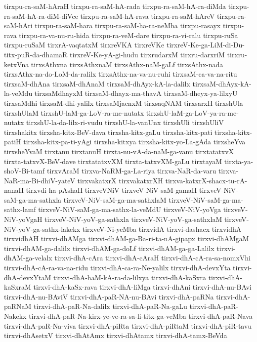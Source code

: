 {tirxpu-ra-saM-hAraH
tirxpu-ra-saM-hA-rada
tirxpu-ra-saM-hA-ra-diMda
tirxpu-ra-saM-hA-ra-diM-diVce
tirxpu-ra-saM-hA-rava
tirxpu-ra-saM-hAreV
tirxpu-ra-saM-hAri
tirxpu-ra-saM-hara
tirxpu-ra-saM-ha-ra-neMba
tirxpu-rasayx
tirxpu-rava
tirxpu-ra-va-nu-ru-hida
tirxpu-ra-veM-dare
tirxpu-ra-vi-ralu
tirxpu-ruSa
tirxpu-ruSaM
tirxrA-vaqtatxM
tirxreVKA
tirxreVKe
tirxreV-Ke-ga-LiM-di-Du-titx-puR-da-dhamaR
tirxreV-Ke-yA-gi-hudu
tirxrudarxM
tirxru-darxriM
tirxru-ketxVna
tirxsAthxna
tirxsAthxnaM
tirxsAthx-naM-gaLf
tirxsAthx-nada
tirxsAthx-na-do-LoM-da-ralilx
tirxsAthx-na-va-nu-ruhi
tirxsaM-ca-va-na-ritu
tirxsaM-dhAna
tirxsaM-dhAnaM
tirxsaM-dhAyx-kA-la-dalilx
tirxsaM-dhAyx-kA-la-veMdu
tirxsaMdhayxM
tirxsaM-dhayx-ma-thavA
tirxsaM-dheyx-ya-lilxyU
tirxsaMdhi
tirxsaM-dhi-yalilx
tirxsaMjacnxM
tirxsaqNAM
tirxsarxH
tirxshUla
tirxshUlaM
tirxshU-laM-ga-LoV-ra-me-nutatx
tirxshU-laM-ga-LoV-ya-ra-me-nutatx
tirxshU-la-da-lilx-ri-vudu
tirxshU-la-vanUnx
tirxshUli
tirxshUliV
tirxshakitx
tirxsha-kitx-BeV-dava
tirxsha-kitx-gaLu
tirxsha-kitx-pati
tirxsha-kitx-patiH
tirxsha-kitx-pa-ti-yAgi
tirxsha-kitxya
tirxsha-kitx-yo-La-gAda
tirxsheYva
tirxsheYvaM
tirxtanu
tirxtanuH
tirxta-nu-vA-da-naM-ga-vanu
tirxtatatxvX
tirxta-tatxvX-BeV-dave
tirxtatatxvXM
tirxta-tatxvXM-gaLu
tirxtayaM
tirxta-ya-shoV-Bi-tamf
tirxvAraM
tirxva-NaRM-ga-La-riya
tirxva-NaR-da-varu
tirxva-NaR-ma-Bi-dhiV-yateV
tirxvakatxrX
tirxvakatxrXH
tirxva-katxrX-shacx-tu-rA-nanaH
tirxvdi-ha-pAshaH
tirxveVNiV
tirxveV-NiV-saM-gamaH
tirxveV-NiV-saM-ga-ma-sathxla
tirxveV-NiV-saM-ga-ma-sathxlaM
tirxveV-NiV-saM-ga-ma-sathx-lamf
tirxveV-NiV-saM-ga-ma-sathx-la-veMdU
tirxveV-NiV-yoVga
tirxveV-NiV-yoVgaH
tirxveV-NiV-yoV-ga-sathxla
tirxveV-NiV-yoV-ga-sathxlaM
tirxveV-NiV-yoV-ga-sathx-lakekx
tirxveV-Ni-yeMba
tirxvidA
tirxvi-dashacx
tirxvidhA
tirxvidhAH
tirxvi-dhAMga
tirxvi-dhAM-ga-Ba-ri-ta-nA-gipapx
tirxvi-dhAMgaM
tirxvi-dhAM-ga-dalilx
tirxvi-dhAM-ga-doLf
tirxvi-dhAM-ga-ga-Lalilx
tirxvi-dhAM-ga-velalx
tirxvi-dhA-cAra
tirxvi-dhA-cAraH
tirxvi-dhA-cA-ra-sa-nomxVhi
tirxvi-dhA-cA-ra-va-na-ridu
tirxvi-dhA-ca-ra-Ne-yalilx
tirxvi-dhA-devxYta
tirxvi-dhA-devxYtaM
tirxvi-dhA-haM-kA-ra-da-lilxya
tirxvi-dhA-kaSxra
tirxvi-dhA-kaSxraM
tirxvi-dhA-kaSx-rava
tirxvi-dhA-liMga
tirxvi-dhAni
tirxvi-dhA-nu-BAvi
tirxvi-dhA-nu-BAviV
tirxvi-dhA-paR-NA-nu-BAvi
tirxvi-dhA-paRNa
tirxvi-dhA-paRNaM
tirxvi-dhA-paR-Na-dalilx
tirxvi-dhA-paR-Na-gaLu
tirxvi-dhA-paR-Nakekx
tirxvi-dhA-paR-Na-kirx-ye-ve-ra-sa-li-titx-ga-veMba
tirxvi-dhA-paR-Nava
tirxvi-dhA-paR-Na-viva
tirxvi-dhA-piRta
tirxvi-dhA-piRtaM
tirxvi-dhA-piR-tavu
tirxvi-dhAsetxV
tirxvi-dhAtAmx
tirxvi-dhAtamx
tirxvi-dhA-tamx-BeVda
}
